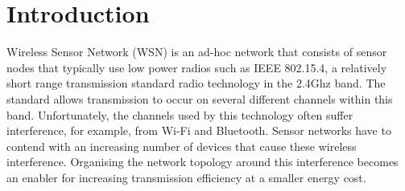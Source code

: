 \section{Introduction}
\label{sec:introduction}
Wireless Sensor Network (WSN) is an ad-hoc network that consists of sensor nodes that typically use low power radios such as IEEE 802.15.4, a relatively short range transmission standard radio technology in the 2.4Ghz band. The standard allows transmission to occur on several different channels within this band. Unfortunately, the channels used by this technology often suffer interference, for example, from Wi-Fi and Bluetooth. Sensor networks have to contend with an increasing number of devices that cause these wireless interference. Organising the network topology around this interference becomes an enabler for increasing transmission efficiency at a smaller energy cost. %




